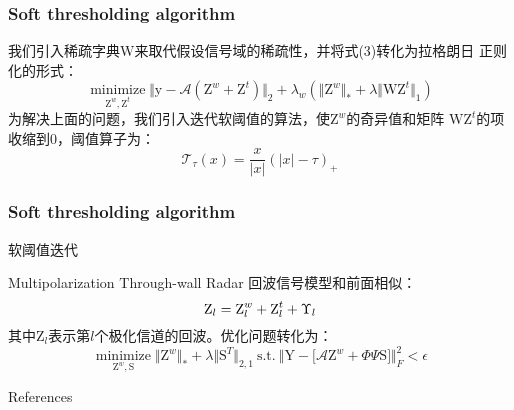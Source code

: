 \documentclass[12pt]{beamer}
\begin{document}
\begin{frame}
  \frametitle{Soft thresholding algorithm}
  我们引入稀疏字典$\text{W}$来取代假设信号域的稀疏性，并将式(3)转化为拉格朗日
  正则化的形式：
  \begin{equation}
\mathop\text{minimize}\limits_{\text{Z}^{w},\text{Z}^{t}} \Vert \text{y}-\mathcal{A}(\text{Z}^{w}+\text{Z}^{t})\Vert_{2}+\lambda_{w}(\Vert \text{Z}^{w}\Vert_{*}+\lambda\Vert \text{WZ}^{t}\Vert_{1})
  \end{equation}
  为解决上面的问题，我们引入迭代软阈值的算法，使$\text{Z}^w$的奇异值和矩阵
  $\text{WZ}^t$的项收缩到0，阈值算子为：
  \begin{equation*}
	\mathcal{T}_{\tau}(x)=\frac{x}{\vert x\vert }(\vert x\vert -\tau)_{+}
  \end{equation*}
\end{frame}
\begin{frame}
  \frametitle{Soft thresholding algorithm}
  \scriptsize
  \begin{algorithm}[H]  
	\caption{软阈值迭代}
	\label{alg:1}
	\begin{algorithmic}[1]
	  \ELSE
	  \ENDIF
	\end{algorithmic}
  \end{algorithm}
\end{frame}
\begin{frame}{Multipolarization Through-wall Radar}
  回波信号模型和前面相似：
  \begin{equation}
	\text{Z}_l=\text Z^{w}_l+\text{Z}_l^{t}+\Upsilon_l
  \end{equation}
  其中$\text{Z}_l$表示第$l$个极化信道的回波。优化问题转化为：
  \begin{equation}
	\mathop{\text{minimize}}\limits_{\text{Z}^{w},\text{S}} \Vert \text{Z}^{w}\Vert_{*}+\lambda\Vert \text{S}^T\Vert_{2,1}\ \text{s.t}.\ \Big\Vert \text{Y}-\big[\mathcal{A}\text{Z}^{w}+\Phi\Psi\text{S}\big]\Big\Vert_{F}^2 < \epsilon
  \end{equation}
\end{frame}
\begin{frame}[allowframebreaks]{References}
  \footnotesize
   
   
\end{frame}
\end{document}
